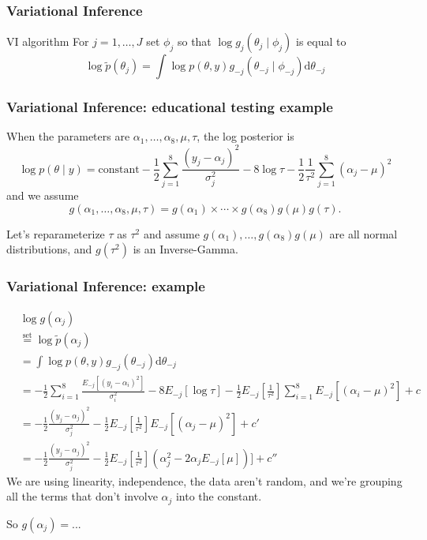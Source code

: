 \documentclass{beamer}
\begin{document}
\begin{frame}[fragile]
\frametitle{Variational Inference}

\begin{block}{VI algorithm}
For $j=1,\ldots,J$ set $\phi_j$ so that $\log g_j(\theta_j \mid \phi_j)$ is equal to 
$$
\log\tilde{p}(\theta_j) = \int\log p(\theta, y)g_{-j}(\theta_{-j} \mid \phi_{-j}) \text{d}\theta_{-j}
$$
\end{block}

\end{frame}

\begin{frame}[fragile]
\frametitle{Variational Inference: educational testing example}

When the parameters are $\alpha_1, \ldots, \alpha_8, \mu, \tau$, the log posterior is
$$
\log p(\theta \mid y) = \text{constant} - \frac{1}{2}\sum_{j=1}^8\frac{(y_j - \alpha_j)^2 }{\sigma^2_j } - 8 \log \tau - \frac{1}{2}\frac{1}{\tau^2}\sum_{j=1}^8(\alpha_j - \mu)^2
$$
and we assume
$$
g(\alpha_1, \ldots, \alpha_8, \mu, \tau) = g(\alpha_1) \times  \cdots \times g(\alpha_8) g(\mu) g(\tau).
$$

Let's reparameterize $\tau$ as $\tau^2$ and assume $g(\alpha_1), \ldots, g(\alpha_8) g(\mu)$ are all normal distributions, and $g(\tau^2)$ is an Inverse-Gamma.

  
\end{frame}


\begin{frame}[fragile]
\frametitle{Variational Inference: example}


\begin{align*}
&\log g(\alpha_j) \\
&\overset{\text{set}}{=} \log\tilde{p}(\alpha_j) \\
&= \int\log p(\theta, y)g_{-j}(\theta_{-j}) \text{d}\theta_{-j} \\
&= - \frac{1}{2}\sum_{i=1}^8\frac{E_{-j}[(y_i - \alpha_i)^2 ] }{\sigma^2_i } - 8 E_{-j}[\log \tau] - \frac{1}{2} E_{-j}\left[\frac{1}{\tau^2}\right] \sum_{i=1}^8 E_{-j}[(\alpha_i - \mu)^2 ] + c \\
&= - \frac{1}{2}\frac{(y_j - \alpha_j)^2 }{\sigma^2_j } -  \frac{1}{2} E_{-j}\left[\frac{1}{\tau^2}\right] E_{-j}[(\alpha_j - \mu)^2 ] + c' \\
&= - \frac{1}{2}\frac{(y_j - \alpha_j)^2 }{\sigma^2_j } -  \frac{1}{2} E_{-j}\left[\frac{1}{\tau^2}\right] (\alpha_j^2 - 2\alpha_j E_{-j}[\mu] ) ] + c''
\end{align*}
We are using linearity, independence, the data aren't random, and we're grouping all the terms that don't involve $\alpha_j$ into the constant.
\newline

So $g(\alpha_j) = $...
\end{frame}
\end{document}

